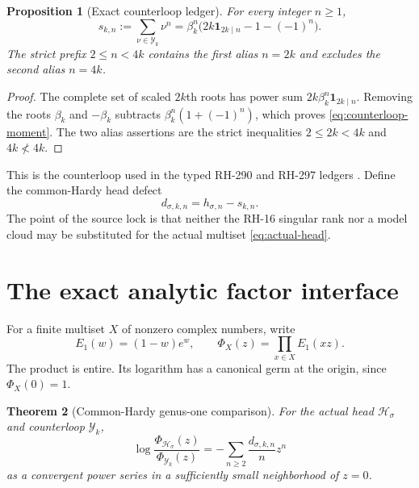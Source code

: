 \documentclass[11pt]{article}
\newtheorem{theorem}{Theorem}[section]
\newtheorem{proposition}[theorem]{Proposition}
\theoremstyle{remark}
\newcommand{\cH}{\mathcal H}
\newcommand{\cY}{\mathcal Y}
\newcommand{\one}{\mathbf 1}
\begin{document}
\begin{proposition}[Exact counterloop ledger]
\label{prop:counterloop}
For every integer $n\ge1$,
\begin{equation}\label{eq:counterloop-moment}
 s_{k,n}:=\sum_{\nu\in\cY_k}\nu^n
 =\beta_k^n\bigl(2k\one_{2k\mid n}-1-(-1)^n\bigr).
\end{equation}
The strict prefix $2\le n<4k$ contains the first alias $n=2k$ and excludes
the second alias $n=4k$.
\end{proposition}

\begin{proof}
The complete set of scaled $2k$th roots has power sum
$2k\beta_k^n\one_{2k\mid n}$.  Removing the roots $\beta_k$ and
$-\beta_k$ subtracts $\beta_k^n(1+(-1)^n)$, which proves
\eqref{eq:counterloop-moment}.  The two alias assertions are the strict
inequalities $2\le2k<4k$ and $4k\not<4k$.
\end{proof}

This is the counterloop used in the typed RH-290 and RH-297 ledgers
\citep{WangTypedLedger2026,WangAliasLedger2026}.  Define the common-Hardy
head defect
\begin{equation}\label{eq:defect}
 d_{\sigma,k,n}=h_{\sigma,n}-s_{k,n}.
\end{equation}
The point of the source lock is that neither the RH-16 singular rank nor a
model cloud may be substituted for the actual multiset \eqref{eq:actual-head}.

\section{The exact analytic factor interface}

For a finite multiset $X$ of nonzero complex numbers, write
\begin{equation}\label{eq:genus-one}
 E_1(w)=(1-w)e^w,
 \qquad \Phi_X(z)=\prod_{x\in X}E_1(xz).
\end{equation}
The product is entire.  Its logarithm has a canonical germ at the origin,
since $\Phi_X(0)=1$.

\begin{theorem}[Common-Hardy genus-one comparison]
\label{thm:factor-interface}
For the actual head $\cH_\sigma$ and counterloop $\cY_k$,
\begin{equation}\label{eq:factor-log}
 \log\frac{\Phi_{\cH_\sigma}(z)}{\Phi_{\cY_k}(z)}
 =-\sum_{n\ge2}\frac{d_{\sigma,k,n}}{n}z^n
\end{equation}
as a convergent power series in a sufficiently small neighborhood of
$z=0$.
\end{theorem}
\end{document}
